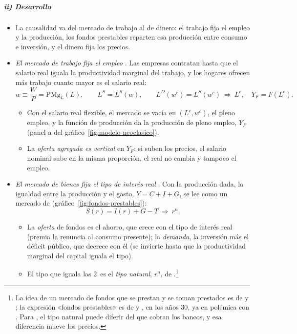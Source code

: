 \documentclass[11pt]{article}
\begin{document}
\subparagraph{ii) Desarrollo}

\begin{itemize}
\item La causalidad va del mercado de trabajo al de dinero: el trabajo fija el empleo y la producción, los fondos prestables reparten esa producción entre consumo e inversión, y el dinero fija los precios.
\item \emph{El mercado de trabajo fija el empleo} . Las empresas contratan hasta que el salario real iguala la productividad marginal del trabajo, y los hogares ofrecen más trabajo cuanto mayor es el salario real:
  \begin{equation}
  w\equiv\frac{W}{P}=\mathrm{PMg}_L(L),\qquad L^S=L^S(w),\qquad L^D(w^c)=L^S(w^c)\ \Rightarrow\ L^c,\quad Y_F=F(L^c). \label{eq:trabajo-neoclasico}
  \end{equation}
  \begin{itemize}
  \item Con el salario real flexible, el mercado se vacía en $(L^c,w^c)$, el pleno empleo, y la función de producción da la producción de pleno empleo, $Y_F$ (panel a del gráfico~\ref{fig:modelo-neoclasico}).
  \item La \emph{oferta agregada es vertical} en $Y_F$: si suben los precios, el salario nominal sube en la misma proporción, el real no cambia y tampoco el empleo.
  \end{itemize}
\item \emph{El mercado de bienes fija el tipo de interés real} . Con la producción dada, la igualdad entre la producción y el gasto, $Y=C+I+G$, se lee como un mercado de  (gráfico~\ref{fig:fondos-prestables}):
  \begin{equation}
  S(r)=I(r)+G-T\ \Rightarrow\ r^n. \label{eq:fondos-prestables}
  \end{equation}
  \begin{itemize}
  \item La \emph{oferta} de fondos es el ahorro, que crece con el tipo de interés real (premia la renuncia al consumo presente); la \emph{demanda}, la inversión más el déficit público, que decrece con él (se invierte hasta que la productividad marginal del capital iguala el tipo).
  \item El tipo que iguala las 2~es el \emph{tipo natural}, $r^n$, de .\footnote{La idea de un mercado de fondos que se prestan y se toman prestados es de  y ; la expresión «fondos prestables» es de  y , en los años 30, ya en polémica con \nocite{DeVroey2016History}. Para , el tipo natural puede diferir del que cobran los bancos, y esa diferencia mueve los precios.}
  \end{itemize}
\end{itemize}
\end{document}
